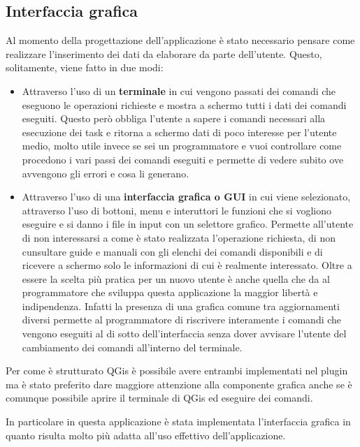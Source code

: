 \subsection{Interfaccia grafica}
Al momento della progettazione dell'applicazione è stato necessario pensare come realizzare l'inserimento dei dati da elaborare da parte dell'utente. Questo, solitamente, viene fatto in due modi:
\begin{itemize}

\item Attraverso l'uso di un \textbf{terminale} in cui vengono passati dei comandi che eseguono le operazioni richieste e mostra a schermo tutti i dati dei comandi eseguiti. Questo però obbliga l'utente a sapere i comandi necessari alla esecuzione dei task e ritorna a schermo dati di poco interesse per l'utente medio, molto utile invece se sei un programmatore e vuoi controllare come procedono i vari passi dei comandi eseguiti e permette di vedere subito ove avvengono gli errori e cosa li generano.

\item Attraverso l'uso di una \textbf{interfaccia grafica o GUI} in cui viene selezionato, attraverso l'uso di bottoni, menu e interuttori le funzioni che si vogliono eseguire e si danno i file in input con un selettore grafico. Permette all'utente di non interessarsi a come è stato realizzata l'operazione richiesta, di non cunsultare guide e manuali con gli elenchi dei comandi disponibili e di ricevere a schermo solo le informazioni di cui è realmente interessato. Oltre a essere la scelta più pratica per un nuovo utente è anche quella che da al programmatore che sviluppa questa applicazione la maggior libertà e indipendenza. Infatti la presenza di una grafica comune tra aggiornamenti diversi permette al programmatore di riscrivere interamente i comandi che vengono eseguiti al di sotto dell'interfaccia senza dover avvisare l'utente del cambiamento dei comandi all'interno del terminale.

\end{itemize}

Per come è strutturato QGis è possibile avere entrambi implementati nel plugin ma è stato preferito dare maggiore attenzione alla componente grafica anche se è comunque possibile aprire il terminale di QGis ed eseguire dei comandi.

In particolare in questa applicazione è stata implementata l'interfaccia grafica in quanto risulta molto più adatta all'uso effettivo dell'applicazione.

